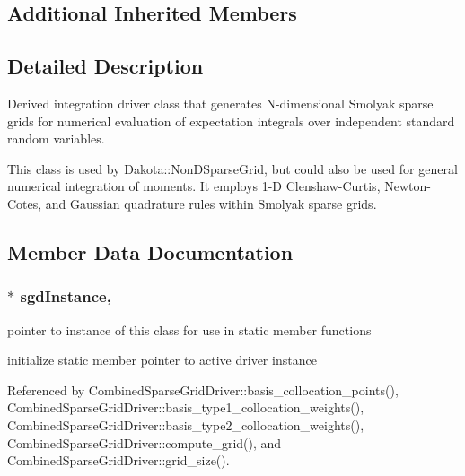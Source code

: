 \subsection*{Additional Inherited Members}


\subsection{Detailed Description}
Derived integration driver class that generates N-\/dimensional Smolyak sparse grids for numerical evaluation of expectation integrals over independent standard random variables. 

This class is used by Dakota\+::\+Non\+D\+Sparse\+Grid, but could also be used for general numerical integration of moments. It employs 1-\/D Clenshaw-\/\+Curtis, Newton-\/\+Cotes, and Gaussian quadrature rules within Smolyak sparse grids. 

\subsection{Member Data Documentation}
\subsubsection[{\texorpdfstring{sgd\+Instance}{sgdInstance}}]{ $\ast$ sgd\+Instance\hspace{0.3cm}{\ttfamily [static]}, {\ttfamily [private]}}\label{classPecos_1_1CombinedSparseGridDriver_ab59a7e6f0acf79265a38279b0d4350d0}


pointer to instance of this class for use in static member functions 

initialize static member pointer to active driver instance 

Referenced by Combined\+Sparse\+Grid\+Driver\+::basis\+\_\+collocation\+\_\+points(), Combined\+Sparse\+Grid\+Driver\+::basis\+\_\+type1\+\_\+collocation\+\_\+weights(), Combined\+Sparse\+Grid\+Driver\+::basis\+\_\+type2\+\_\+collocation\+\_\+weights(), Combined\+Sparse\+Grid\+Driver\+::compute\+\_\+grid(), and Combined\+Sparse\+Grid\+Driver\+::grid\+\_\+size().

